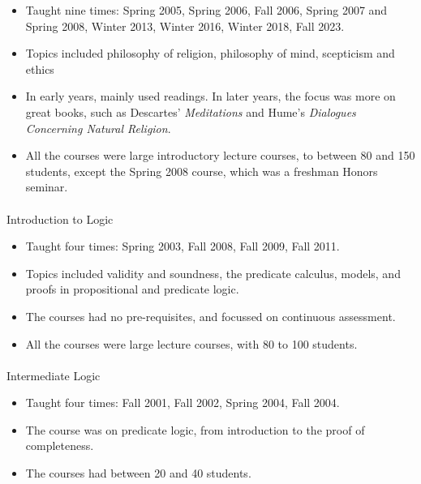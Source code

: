 \documentclass[
  10pt,
  letterpaper,
  DIV=11,
  numbers=noendperiod,
  twoside]{scrartcl}
\makeatletter
\let\oldparagraph\paragraph
\renewcommand{\paragraph}{
    \@ifstar
      \xxxParagraphStar
      \xxxParagraphNoStar
  }
\newcommand{\xxxParagraphStar}[1]{\oldparagraph*{#1}\mbox{}}
\newcommand{\xxxParagraphNoStar}[1]{\oldparagraph{#1}\mbox{}}
\providecommand{\tightlist}{%
  \setlength{\itemsep}{0pt}\setlength{\parskip}{0pt}}
\makeatother
\begin{document}
\begin{itemize}
\tightlist
\item
  Taught nine times: Spring 2005, Spring 2006, Fall 2006, Spring 2007
  and Spring 2008, Winter 2013, Winter 2016, Winter 2018, Fall 2023.
\item
  Topics included philosophy of religion, philosophy of mind, scepticism
  and ethics
\item
  In early years, mainly used readings. In later years, the focus was
  more on great books, such as Descartes' \emph{Meditations} and Hume's
  \emph{Dialogues Concerning Natural Religion}.
\item
  All the courses were large introductory lecture courses, to between 80
  and 150 students, except the Spring 2008 course, which was a freshman
  Honors seminar.
\end{itemize}

\paragraph{Introduction to Logic}\label{introduction-to-logic}

\begin{itemize}
\tightlist
\item
  Taught four times: Spring 2003, Fall 2008, Fall 2009, Fall 2011.
\item
  Topics included validity and soundness, the predicate calculus,
  models, and proofs in propositional and predicate logic.
\item
  The courses had no pre-requisites, and focussed on continuous
  assessment.
\item
  All the courses were large lecture courses, with 80 to 100 students.
\end{itemize}

\paragraph{Intermediate Logic}\label{intermediate-logic}

\begin{itemize}
\tightlist
\item
  Taught four times: Fall 2001, Fall 2002, Spring 2004, Fall 2004.
\item
  The course was on predicate logic, from introduction to the proof of
  completeness.
\item
  The courses had between 20 and 40 students.
\end{itemize}
\end{document}

